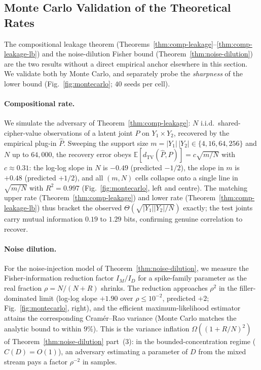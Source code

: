 \documentclass[11pt]{article}
\theoremstyle{definition}
\theoremstyle{plain}
\theoremstyle{remark}
\newcommand{\TV}{d_{\mathrm{TV}}}
\begin{document}
\subsection{Monte Carlo Validation of the Theoretical Rates}
\label{subsec:montecarlo}

The compositional leakage theorem
(Theorems~\ref{thm:comp-leakage}--\ref{thm:comp-leakage-lb}) and the
noise-dilution Fisher bound (Theorem~\ref{thm:noise-dilution}) are the
two results without a direct empirical anchor elsewhere in this
section.  We validate both by Monte Carlo, and separately probe the
\emph{sharpness} of the lower bound
(Fig.~\ref{fig:montecarlo}; $40$ seeds per cell).

\paragraph{Compositional rate.}
We simulate the adversary of Theorem~\ref{thm:comp-leakage}:
$N$ i.i.d.\ shared-cipher-value observations of a latent joint $P$ on
$Y_1 \times Y_2$, recovered by the empirical plug-in $\hat P$.  Sweeping
the support size $m = |Y_1|\,|Y_2| \in \{4, 16, 64, 256\}$ and
$N$ up to $64{,}000$, the recovery error obeys
$\mathbb{E}[\TV(\hat P, P)] = c\sqrt{m/N}$ with $c \approx 0.31$: the
log-log slope in $N$ is $-0.49$ (predicted $-1/2$), the slope in $m$ is
$+0.48$ (predicted $+1/2$), and all $(m, N)$ cells collapse onto a
single line in $\sqrt{m/N}$ with $R^2 = 0.997$
(Fig.~\ref{fig:montecarlo}, left and centre).  The matching upper rate
(Theorem~\ref{thm:comp-leakage}) and lower rate
(Theorem~\ref{thm:comp-leakage-lb}) thus bracket the observed
$\Theta(\sqrt{|Y_1||Y_2|/N})$ exactly; the test joints carry mutual
information $0.19$ to $1.29$ bits, confirming genuine correlation to
recover.

\paragraph{Noise dilution.}
For the noise-injection model of Theorem~\ref{thm:noise-dilution}, we
measure the Fisher-information reduction factor $I_M/I_D$ for a
spike-family parameter as the real fraction $\rho = N/(N{+}R)$ shrinks.
The reduction approaches $\rho^2$ in the filler-dominated limit
(log-log slope $+1.90$ over $\rho \leq 10^{-2}$, predicted $+2$;
Fig.~\ref{fig:montecarlo}, right), and the efficient maximum-likelihood
estimator attains the corresponding Cram\'er--Rao variance (Monte Carlo
matches the analytic bound to within $9\%$).  This is the variance
inflation $\Omega((1 + R/N)^2)$ of Theorem~\ref{thm:noise-dilution}
part~(3): in the bounded-concentration regime ($C(D) = O(1)$), an
adversary estimating a parameter of $D$ from the mixed stream pays a
factor $\rho^{-2}$ in samples.
\end{document}
